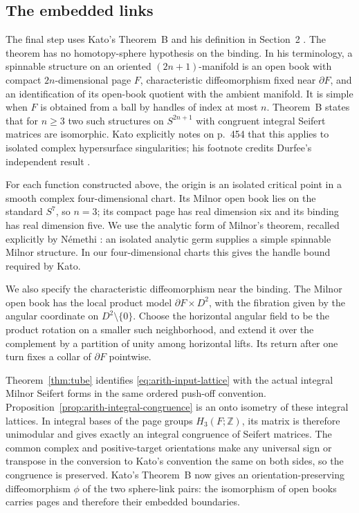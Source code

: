 \subsection{The embedded links}\label{subsec:arith-links}

The final step uses Kato's Theorem~B and his definition in Section~2
\cite[pp.~454--455]{Kato1974}. The theorem
has no homotopy-sphere hypothesis on the binding. In his terminology,
a spinnable structure
on an oriented $(2n+1)$-manifold is an open book with compact
$2n$-dimensional page $F$, characteristic diffeomorphism fixed
near $\partial F$, and an identification of its open-book quotient
with the ambient manifold.  It is simple when $F$ is obtained from
a ball by handles of index at most $n$.  Theorem~B states that for
$n\ge3$ two such structures on $S^{2n+1}$ with congruent integral
Seifert matrices are isomorphic.  Kato explicitly notes on p.~454
that this applies to isolated complex hypersurface singularities;
his footnote credits Durfee's independent result
\cite{Durfee1974}.

For each function constructed above, the origin is an isolated
critical point in a smooth complex four-dimensional chart.  Its
Milnor open book lies on the standard $S^7$, so $n=3$; its compact
page has real dimension six and its binding has real dimension five.
We use the analytic form of Milnor's theorem, recalled explicitly by
N\'emethi \cite[pp.~63--64]{Nemethi1999SeifertInfinity}: an isolated
analytic germ supplies a simple spinnable Milnor structure. In our
four-dimensional charts this gives the handle bound required by Kato.

We also specify the characteristic diffeomorphism near the binding.
The Milnor open book has the local product model
$\partial F\times D^2$, with the fibration given by the angular
coordinate on $D^2\setminus\{0\}$. Choose the horizontal angular
field to be the product rotation on a smaller such neighborhood,
and extend it over the complement by a partition of unity among
horizontal lifts. Its return after one turn fixes a collar of
$\partial F$ pointwise.

Theorem~\ref{thm:tube} identifies \eqref{eq:arith-input-lattice}
with the actual integral Milnor Seifert forms in the same ordered
push-off convention. Proposition~\ref{prop:arith-integral-congruence}
is an onto isometry of these integral lattices. In integral bases
of the page groups $H_3(F;\mathbb Z)$, its matrix is therefore
unimodular and gives exactly an integral congruence of Seifert
matrices. The common complex and positive-target orientations
make any universal sign or transpose in the conversion to Kato's
convention the same on both sides, so the congruence is preserved.
Kato's Theorem~B now gives an orientation-preserving diffeomorphism
$\phi$ of the two sphere-link pairs: the isomorphism of open books
carries pages and therefore their embedded boundaries.

